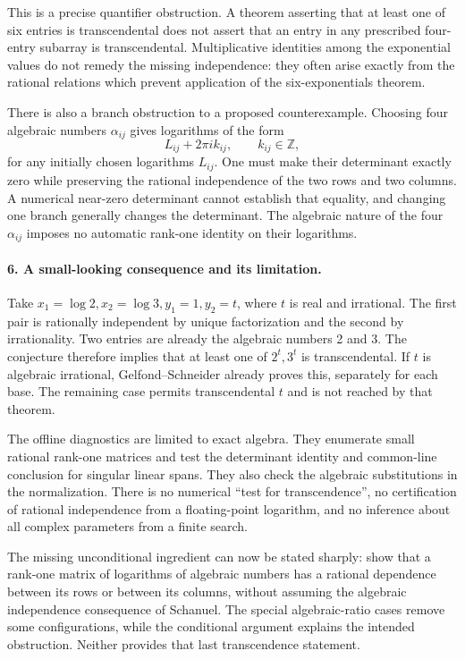 \documentclass[11pt]{article}
\begin{document}
This is a precise quantifier obstruction. A theorem asserting that at least one of six entries is transcendental does not assert that an entry in any prescribed four-entry subarray is transcendental. Multiplicative identities among the exponential values do not remedy the missing independence: they often arise exactly from the rational relations which prevent application of the six-exponentials theorem.

There is also a branch obstruction to a proposed counterexample. Choosing four algebraic numbers $\alpha_{ij}$ gives logarithms of the form
\[
 L_{ij}+2\pi i k_{ij},\qquad k_{ij}\in\mathbb Z,
\]
for any initially chosen logarithms $L_{ij}$. One must make their determinant exactly zero while preserving the rational independence of the two rows and two columns. A numerical near-zero determinant cannot establish that equality, and changing one branch generally changes the determinant. The algebraic nature of the four $\alpha_{ij}$ imposes no automatic rank-one identity on their logarithms.

\paragraph{6. A small-looking consequence and its limitation.}
Take $x_1=\log2,x_2=\log3,y_1=1,y_2=t$, where $t$ is real and irrational. The first pair is rationally independent by unique factorization and the second by irrationality. Two entries are already the algebraic numbers 2 and 3. The conjecture therefore implies that at least one of $2^t,3^t$ is transcendental. If $t$ is algebraic irrational, Gelfond--Schneider already proves this, separately for each base. The remaining case permits transcendental $t$ and is not reached by that theorem.

The offline diagnostics are limited to exact algebra. They enumerate small rational rank-one matrices and test the determinant identity and common-line conclusion for singular linear spans. They also check the algebraic substitutions in the normalization. There is no numerical ``test for transcendence'', no certification of rational independence from a floating-point logarithm, and no inference about all complex parameters from a finite search.

The missing unconditional ingredient can now be stated sharply: show that a rank-one matrix of logarithms of algebraic numbers has a rational dependence between its rows or between its columns, without assuming the algebraic independence consequence of Schanuel. The special algebraic-ratio cases remove some configurations, while the conditional argument explains the intended obstruction. Neither provides that last transcendence statement.
\end{document}
